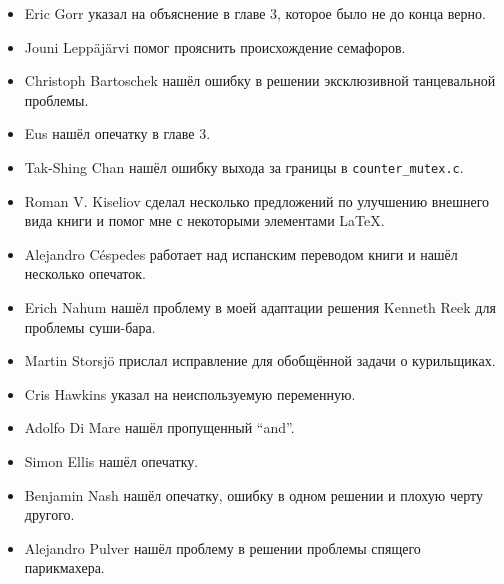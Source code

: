 \begin{itemize}
\item Eric Gorr указал на объяснение в главе 3, которое было не до конца верно.

\item Jouni Lepp\"{a}j\"{a}rvi помог прояснить происхождение семафоров.

\item Christoph Bartoschek нашёл ошибку в решении эксклюзивной танцевальной
проблемы.

\item Eus нашёл опечатку в главе 3.

\item Tak-Shing Chan нашёл ошибку выхода за границы в {\tt counter\_mutex.c}.

\item Roman V. Kiseliov сделал несколько предложений по улучшению внешнего вида
книги и помог мне с некоторыми элементами \LaTeX.

\item Alejandro C\'{e}spedes работает над испанским переводом книги и нашёл
несколько опечаток.

\item Erich Nahum нашёл проблему в моей адаптации решения Kenneth Reek для
проблемы суши-бара.

\item Martin Storsj\"{o} прислал исправление для обобщённой
задачи о курильщиках.

\item Cris Hawkins указал на неиспользуемую переменную.

\item Adolfo Di Mare нашёл пропущенный ``and''.

\item Simon Ellis нашёл опечатку.

\item Benjamin Nash нашёл опечатку, ошибку в одном решении
и плохую черту другого.

\item Alejandro Pulver нашёл проблему в решении проблемы спящего парикмахера.

\end{itemize}
